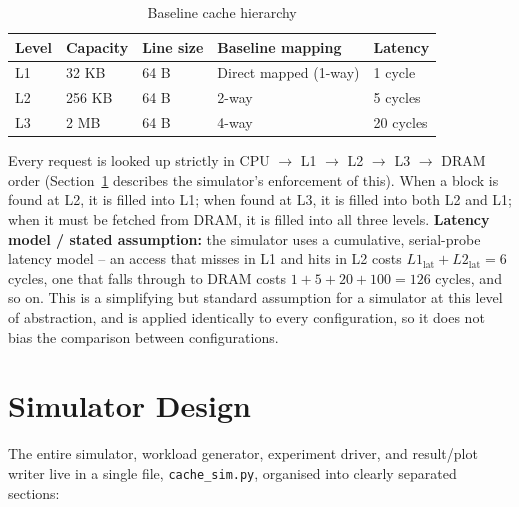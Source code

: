 \documentclass[11pt]{article}
\begin{document}
\begin{table}[H]
\centering
\begin{tabular}{lllll}
\toprule
Level & Capacity & Line size & Baseline mapping & Latency \\
\midrule
L1 & 32 KB & 64 B & Direct mapped (1-way) & 1 cycle \\
L2 & 256 KB & 64 B & 2-way & 5 cycles \\
L3 & 2 MB & 64 B & 4-way & 20 cycles \\
\bottomrule
\end{tabular}
\caption{Baseline cache hierarchy}
\end{table}

Every request is looked up strictly in CPU $\to$ L1 $\to$ L2 $\to$ L3 $\to$
DRAM order (Section~\ref{sec:sim} describes the simulator's enforcement of
this). When a block is found at L2, it is filled into L1; when found at
L3, it is filled into both L2 and L1; when it must be fetched from DRAM,
it is filled into all three levels. \textbf{Latency model / stated
assumption:} the simulator uses a cumulative, serial-probe latency model
-- an access that misses in L1 and hits in L2 costs
$L1_{\text{lat}}+L2_{\text{lat}}=6$ cycles, one that falls through to DRAM
costs $1+5+20+100=126$ cycles, and so on. This is a simplifying but
standard assumption for a simulator at this level of abstraction, and is
applied identically to every configuration, so it does not bias the
comparison between configurations.

\section{Simulator Design}
\label{sec:sim}

The entire simulator, workload generator, experiment driver, and
result/plot writer live in a single file, \texttt{cache\_sim.py}, organised
into clearly separated sections:
\end{document}
